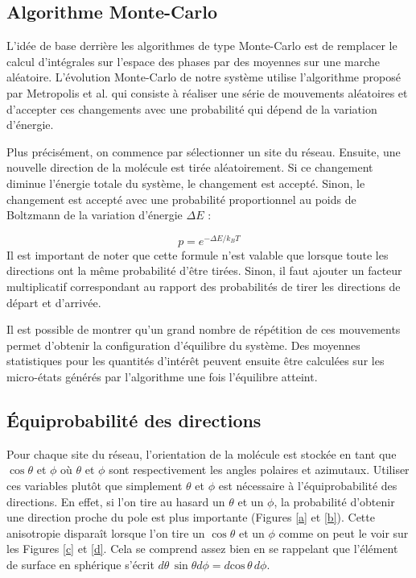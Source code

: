 \documentclass[11pt,a4paper]{article}
\numberwithin{equation}{section}
\begin{document}
\subsection{Algorithme Monte-Carlo}

L'idée de base derrière les algorithmes de type Monte-Carlo est de remplacer le calcul d'intégrales sur l'espace des phases par des moyennes sur une marche aléatoire. L'évolution Monte-Carlo de notre système utilise l'algorithme proposé par Metropolis et al. \cite{metropolis} qui consiste à réaliser une série de mouvements aléatoires et d'accepter ces changements avec une probabilité qui dépend de la variation d'énergie.\medskip

Plus précisément, on commence par sélectionner un site du réseau. Ensuite, une nouvelle direction de la molécule est tirée aléatoirement. Si ce changement diminue l'énergie totale du système, le changement est accepté. Sinon, le changement est accepté avec une probabilité proportionnel au poids de Boltzmann de la variation d'énergie $\Delta E$ :

\begin{equation}
p = e^{-\Delta E / k_B T}
\label{boltzmannprob}
\end{equation}
Il est important de noter que cette formule n'est valable que lorsque toute les directions ont la même probabilité d'être tirées. Sinon, il faut ajouter un facteur multiplicatif correspondant au rapport des probabilités de tirer les directions de départ et d'arrivée.
\medskip

Il est possible de montrer qu'un grand nombre de répétition de ces mouvements permet d'obtenir la configuration d'équilibre du système. Des moyennes statistiques pour les quantités d'intérêt peuvent ensuite être calculées sur les micro-états générés par l'algorithme une fois l'équilibre atteint.

\subsection{Équiprobabilité des directions}
Pour chaque site du réseau, l'orientation de la molécule est stockée en tant que $\cos \theta$ et $\phi$ où $\theta$ et $\phi$ sont respectivement les angles polaires et azimutaux. Utiliser ces variables plutôt que simplement $\theta$ et $\phi$ est nécessaire à l'équiprobabilité des directions. En effet, si l'on tire au hasard un $\theta$ et un $\phi$, la probabilité d'obtenir une direction proche du pole est plus importante (Figures \ref{a} et \ref{b}). Cette anisotropie disparaît lorsque l'on tire un $\cos \theta$ et un $\phi$ comme on peut le voir sur les Figures \ref{c} et \ref{d}. Cela se comprend assez bien en se rappelant que l'élément de surface en sphérique s'écrit $d\theta\, \sin \theta d\phi = d\text{cos}\,\theta\, d\phi$.
\end{document}

